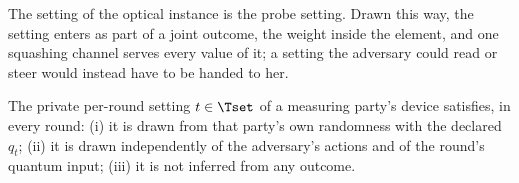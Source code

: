 
The setting of the optical instance is the probe setting. Drawn this way,
the setting enters as part of a joint outcome, the weight inside the
element, and one squashing channel serves every value of it; a setting the
adversary could read or steer would instead have to be handed to her.

\begin{assumption}\label{ass:probe}
The private per-round setting $t\in\Tset$ of a measuring party's device
satisfies, in every round:
(i) it is drawn from that party's own randomness with the
declared  $q_t$;
(ii) it is drawn independently of the adversary's actions and of the round's
quantum input;
(iii) it is not inferred from any outcome.
\end{assumption}
